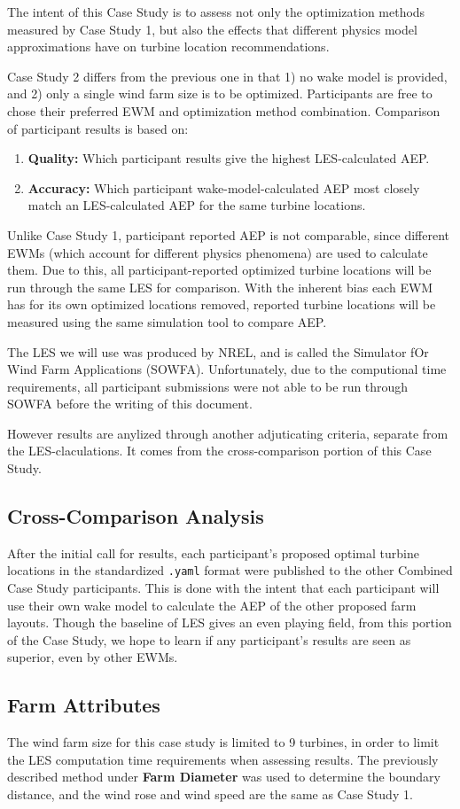 The intent of this Case Study is to assess not only the optimization methods measured by Case Study 1, but also the effects that different physics model approximations have on turbine location recommendations.

Case Study 2 differs from the previous one in that 1) no wake model is provided, and 2) only a single wind farm size is to be optimized.
Participants are free to chose their preferred EWM and optimization method combination.
Comparison of participant results is based on:
\begin{enumerate}
	\item \textbf{Quality:} Which participant results give the highest LES-calculated AEP.
	\item \textbf{Accuracy:} Which participant wake-model-calculated AEP most closely match an LES-calculated AEP for the same turbine locations.
\end{enumerate}

Unlike Case Study 1, participant reported AEP is not comparable, since different EWMs (which account for different physics phenomena) are used to calculate them.
Due to this, all participant-reported optimized turbine locations will be run through the same LES for comparison.
With the inherent bias each EWM has for its own optimized locations removed, reported turbine locations will be measured using the same simulation tool to compare AEP.

The LES we will use was produced by NREL, and is called the Simulator fOr Wind Farm Applications (SOWFA).
Unfortunately, due to the computional time requirements, all participant submissions were not able to be run through SOWFA before the writing of this document.

However results are anylized through another adjuticating criteria, separate from the LES-claculations.
It comes from the cross-comparison portion of this Case Study.

\subsection{Cross-Comparison Analysis}
After the initial call for results, each participant's proposed optimal turbine locations in the standardized \texttt{.yaml} format were published to the other Combined Case Study participants.
This is done with the intent that each participant will use their own wake model to calculate the AEP of the other proposed farm layouts.
Though the baseline of LES gives an even playing field, from this portion of the Case Study, we hope to learn if any participant's results are seen as superior, even by other EWMs.

\subsection{Farm Attributes}
The wind farm size for this case study is limited to 9 turbines, in order to limit the LES computation time requirements when assessing results.
The previously described method under \textbf{Farm Diameter} was used to determine the boundary distance, and the wind rose and wind speed are the same as Case Study 1.